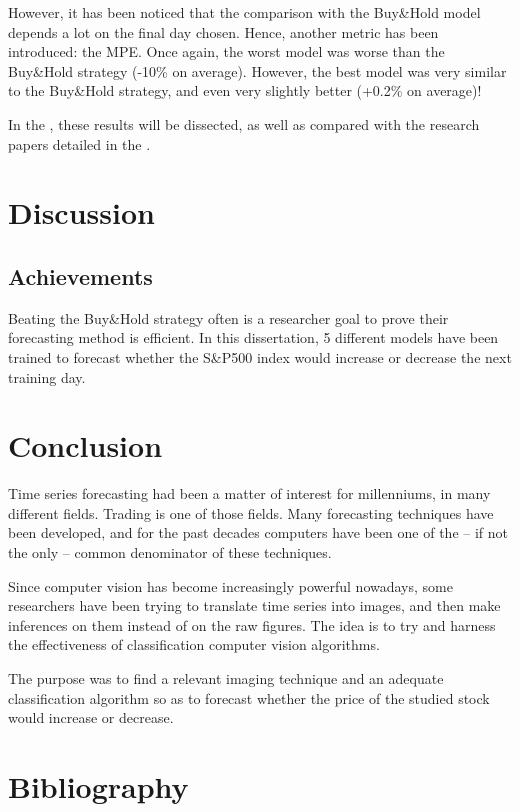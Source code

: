 \documentclass[11pt]{article}
\begin{document}
\begin{onehalfspace}
However, it has been noticed that the comparison with the Buy\&Hold model depends a lot on the final day chosen. Hence, another metric has been introduced: the MPE. Once again, the worst model was worse than the Buy\&Hold strategy (-10\% on average). However, the best model was very similar to the Buy\&Hold strategy, and even very slightly better (+0.2\% on average)!

In the , these results will be dissected, as well as compared with the research papers detailed in the .

\pagebreak

\section{Discussion}
\label{discuss}

\subsection{Achievements}
Beating the Buy\&Hold strategy often is a researcher goal to prove their forecasting method is efficient. In this dissertation, 5 different models have been trained to forecast whether the S\&P500 index would increase or decrease the next training day. 


\pagebreak

\section{Conclusion}
\label{concl}

Time series forecasting had been a matter of interest for millenniums, in many different fields. Trading is one of those fields. Many forecasting techniques have been developed, and for the past decades computers have been one of the -- if not the only -- common denominator of these techniques. 

Since computer vision has become increasingly powerful nowadays, some researchers have been trying to translate time series into images, and then make inferences on them instead of on the raw figures. The idea is to try and harness the effectiveness of classification computer vision algorithms. 

The purpose was to find a relevant imaging technique and an adequate classification algorithm so as to forecast whether the price of the studied stock would increase or decrease. 


\pagebreak
\section{Bibliography}


\end{onehalfspace}
\end{document}
